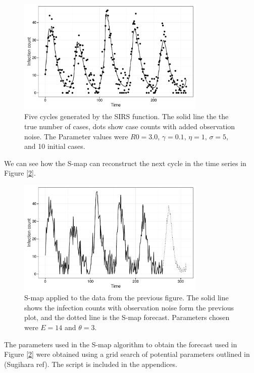 \documentclass[12pt]{article}
\begin{document}
	\begin{figure}[H]
        \centering
        \captionsetup{width=.8\linewidth}
        \includegraphics[width=0.8\textwidth]{./images/dataplot.pdf}
        \caption{Five cycles generated by the SIRS function. The solid line the the true number of cases, dots show case counts with added observation noise. The Parameter values were $R0 = 3.0$, $\gamma = 0.1$, $\eta = 1$, $\sigma = 5$, and 10 initial cases.}
        \label{dataplot}
    \end{figure}

    We can see how the S-map can reconstruct the next cycle in the time series in Figure [\ref{smap_project}].

    \begin{figure}[H]
        \centering
        \captionsetup{width=.8\linewidth}
        \includegraphics[width=0.8\textwidth]{./images/smap-project.pdf}
        \caption{S-map applied to the data from the previous figure. The solid line shows the infection counts with observation noise form the previous plot, and the dotted line is the S-map forecast. Parameters chosen were $E = 14$ and $\theta = 3$.}
        \label{smap_project}
    \end{figure}

    The parameters used in the S-map algorithm to obtain the forecast used in Figure [\ref{smap_project}] were obtained using a grid search of potential parameters outlined in (Sugihara ref). The script is included in the appendices.
\end{document}
